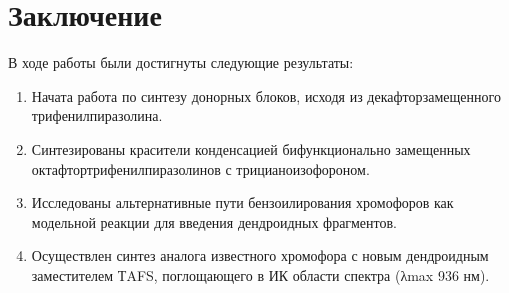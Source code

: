 \section{Заключение}
В ходе работы были достигнуты следующие результаты:
\begin{enumerate}
    \item Начата работа по синтезу донорных блоков, исходя из декафторзамещенного трифенилпиразолина.
    \item Синтезированы красители конденсацией бифункционально замещенных октафтортрифенилпиразолинов с трицианоизофороном. 
    \item Исследованы альтернативные пути бензоилирования хромофоров как модельной реакции для введения дендроидных фрагментов. 
    \item Осуществлен синтез аналога известного хромофора с новым дендроидным заместителем ТAFS, поглощающего в ИК области спектра (λmax 936 нм).
\end{enumerate}

